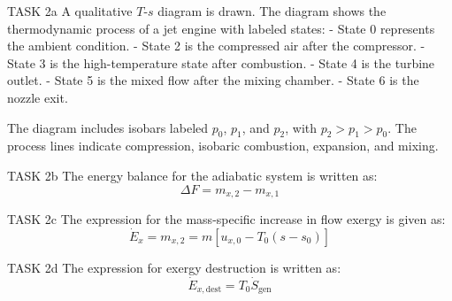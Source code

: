 TASK 2a  
A qualitative \( T \)-\( s \) diagram is drawn. The diagram shows the thermodynamic process of a jet engine with labeled states:  
- State 0 represents the ambient condition.  
- State 2 is the compressed air after the compressor.  
- State 3 is the high-temperature state after combustion.  
- State 4 is the turbine outlet.  
- State 5 is the mixed flow after the mixing chamber.  
- State 6 is the nozzle exit.  

The diagram includes isobars labeled \( p_0 \), \( p_1 \), and \( p_2 \), with \( p_2 > p_1 > p_0 \). The process lines indicate compression, isobaric combustion, expansion, and mixing.  

TASK 2b  
The energy balance for the adiabatic system is written as:  
\[
\Delta F = m_{x,2} - m_{x,1}
\]  

TASK 2c  
The expression for the mass-specific increase in flow exergy is given as:  
\[
\dot{E}_x = m_{x,2} = m \left[ u_{x,0} - T_0 (s - s_0) \right]
\]  

TASK 2d  
The expression for exergy destruction is written as:  
\[
\dot{E}_{x,\text{dest}} = T_0 \dot{S}_{\text{gen}}
\]